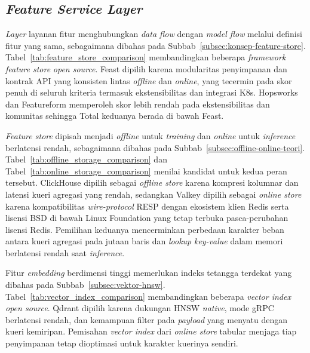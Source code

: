 \subsection{\textit{Feature Service Layer}}
\label{subsec:pilih-fitur}

\textit{Layer} layanan fitur menghubungkan \textit{data flow} dengan \textit{model flow} melalui definisi fitur yang sama, sebagaimana dibahas pada Subbab~\ref{subsec:konsep-feature-store}. Tabel~\ref{tab:feature_store_comparison} membandingkan beberapa \textit{framework} \textit{feature store} \textit{open source}. Feast dipilih karena modularitas penyimpanan dan kontrak API yang konsisten lintas \textit{offline} dan \textit{online}, yang tecermin pada skor penuh di seluruh kriteria termasuk ekstensibilitas dan integrasi K8s. Hopsworks dan Featureform memperoleh skor lebih rendah pada ekstensibilitas dan komunitas sehingga Total keduanya berada di bawah Feast.



\textit{Feature store} dipisah menjadi \textit{offline} untuk \textit{training} dan \textit{online} untuk \textit{inference} berlatensi rendah, sebagaimana dibahas pada Subbab~\ref{subsec:offline-online-teori}. Tabel~\ref{tab:offline_storage_comparison} dan Tabel~\ref{tab:online_storage_comparison} menilai kandidat untuk kedua peran tersebut. ClickHouse dipilih sebagai \textit{offline store} karena kompresi kolumnar dan latensi kueri agregasi yang rendah, sedangkan Valkey dipilih sebagai \textit{online store} karena kompatibilitas \textit{wire-protocol} RESP dengan ekosistem klien Redis serta lisensi BSD di bawah Linux Foundation yang tetap terbuka pasca-perubahan lisensi Redis. Pemilihan keduanya mencerminkan perbedaan karakter beban antara kueri agregasi pada jutaan baris dan \textit{lookup} \textit{key-value} dalam memori berlatensi rendah saat \textit{inference}.





Fitur \textit{embedding} berdimensi tinggi memerlukan indeks tetangga terdekat yang dibahas pada Subbab~\ref{subsec:vektor-hnsw}. Tabel~\ref{tab:vector_index_comparison} membandingkan beberapa \textit{vector index} \textit{open source}. Qdrant dipilih karena dukungan HNSW \textit{native}, mode gRPC berlatensi rendah, dan kemampuan filter pada \textit{payload} yang menyatu dengan kueri kemiripan. Pemisahan \textit{vector index} dari \textit{online store} tabular menjaga tiap penyimpanan tetap dioptimasi untuk karakter kuerinya sendiri.

